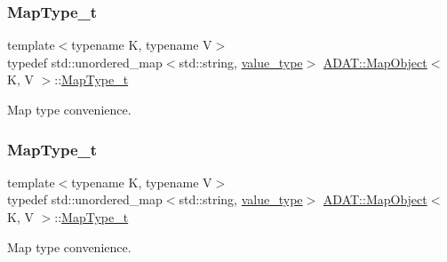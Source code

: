 \mbox{\label{classADAT_1_1MapObject_ad6a4952087d3de5a43d08b2ea2ad270b}} 
\subsubsection{\texorpdfstring{MapType\_t}{MapType\_t}\hspace{0.1cm}{\footnotesize\ttfamily [1/2]}}
{\footnotesize\ttfamily template$<$typename K, typename V$>$ \\
typedef std\+::unordered\+\_\+map$<$std\+::string, \mbox{\hyperlink{classADAT_1_1MapObject_ad985e6ff5b35a72c79d4b466d316cc0a}{value\+\_\+type}}$>$ \mbox{\hyperlink{classADAT_1_1MapObject}{A\+D\+A\+T\+::\+Map\+Object}}$<$ K, V $>$\+::\mbox{\hyperlink{classADAT_1_1MapObject_ad6a4952087d3de5a43d08b2ea2ad270b}{Map\+Type\+\_\+t}}}



Map type convenience. 

\mbox{\label{classADAT_1_1MapObject_ad6a4952087d3de5a43d08b2ea2ad270b}} 
\subsubsection{\texorpdfstring{MapType\_t}{MapType\_t}\hspace{0.1cm}{\footnotesize\ttfamily [2/2]}}
{\footnotesize\ttfamily template$<$typename K, typename V$>$ \\
typedef std\+::unordered\+\_\+map$<$std\+::string, \mbox{\hyperlink{classADAT_1_1MapObject_ad985e6ff5b35a72c79d4b466d316cc0a}{value\+\_\+type}}$>$ \mbox{\hyperlink{classADAT_1_1MapObject}{A\+D\+A\+T\+::\+Map\+Object}}$<$ K, V $>$\+::\mbox{\hyperlink{classADAT_1_1MapObject_ad6a4952087d3de5a43d08b2ea2ad270b}{Map\+Type\+\_\+t}}}



Map type convenience. 

\mbox{\label{classADAT_1_1MapObject_ad985e6ff5b35a72c79d4b466d316cc0a}} 
